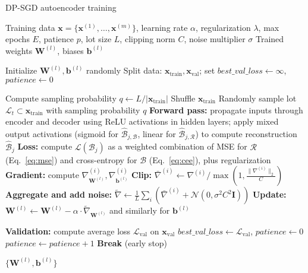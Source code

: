 \begin{algorithm}[!t]
\footnotesize
\caption{DP-SGD autoencoder training} \label{alg:dp_sgd}
\begin{algorithmic}[1]
\REQUIRE Training data $\mathbf{x} = \{\mathbf{x}^{(1)}, \dots, \mathbf{x}^{(m)}\}$, learning rate $\alpha$, regularization $\lambda$, max epochs $E$, patience $p$, lot size $L$, clipping norm $C$, noise multiplier $\sigma$
\ENSURE Trained weights $\mathbf{W}^{(l)}$, biases $\mathbf{b}^{(l)}$

\STATE Initialize $\mathbf{W}^{(l)}, \mathbf{b}^{(l)}$ randomly
\STATE Split data: $\mathbf{x}_{\text{train}}, \mathbf{x}_{\text{val}}$; set $best\_val\_loss \leftarrow \infty$, $patience \leftarrow 0$

    \STATE Compute sampling probability $q \leftarrow L / |\mathbf{x}_{\text{train}}|$
    \STATE Shuffle $\mathbf{x}_{\text{train}}$
        \STATE Randomly sample lot $\mathcal{L}_t \subset \mathbf{x}_{\text{train}}$ with sampling probability $q$
            \STATE \textbf{Forward pass:} propagate inputs through encoder and decoder using ReLU activations in hidden layers; apply mixed output activations (sigmoid for $\hat{\mathcal{B}}_{j,\mathcal{B}}$, linear for $\hat{\mathcal{B}}_{j,\mathcal{R}}$) to compute reconstruction $\hat{\mathcal{B}}_j$
            \STATE \textbf{Loss:} compute $\mathcal{L}(\mathcal{B}_j)$ as a weighted combination of MSE for $\mathcal{R}$ (Eq.~\ref{eq:mse}) and cross-entropy for $\mathcal{B}$ (Eq.~\ref{eq:cee}), plus regularization
            \STATE \textbf{Gradient:} compute $\nabla^{(i)}_{\mathbf{W}^{(l)}}, \nabla^{(i)}_{\mathbf{b}^{(l)}}$
            \STATE \textbf{Clip:} $\bar\nabla^{(i)} \leftarrow \nabla^{(i)} / \max\left(1, \frac{\|\nabla^{(i)}\|_2}{C}\right)$
        \ENDFOR
        \STATE \textbf{Aggregate and add noise:} $\tilde{\nabla} \leftarrow \frac{1}{L} \sum_i(\bar\nabla^{(i)} + \mathcal{N}(0, \sigma^2 C^2 \mathbf{I}))$
        \STATE \textbf{Update:} $\mathbf{W}^{(l)} \leftarrow \mathbf{W}^{(l)} - \alpha \cdot \tilde{\nabla}_{\mathbf{W}^{(l)}}$ and similarly for $\mathbf{b}^{(l)}$
    \ENDFOR

    \STATE \textbf{Validation:} compute average loss $\mathcal{L}_{\text{val}}$ on $\mathbf{x}_{\text{val}}$
        \STATE $best\_val\_loss \leftarrow \mathcal{L}_{\text{val}}$, $patience \leftarrow 0$
    \ELSE
        \STATE $patience \leftarrow patience + 1$
            \STATE \textbf{Break} (early stop)
        \ENDIF
    \ENDIF
\ENDFOR

\RETURN $\{\mathbf{W}^{(l)}, \mathbf{b}^{(l)}\}$
\end{algorithmic}
\end{algorithm}